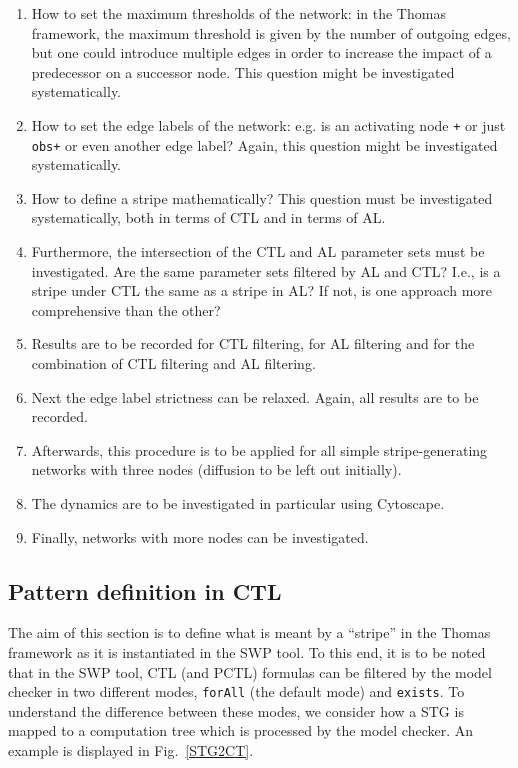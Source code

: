 \documentclass{article}
\begin{document}
\begin{flushleft}
\begin{enumerate}
  \item How to set the maximum thresholds of the network: in the Thomas
  framework, the maximum threshold is given by the number of outgoing edges, but
  one could introduce multiple edges in order to increase the impact of a
  predecessor on a successor node. This question might be investigated
  systematically.
  \item How to set the edge labels of the network: e.g. is an activating node
  {\tt +} or just {\tt obs+} or even another edge label? Again, this question
  might be investigated systematically.
  \item How to define a stripe mathematically? This question must be
  investigated systematically, both in terms of CTL and in terms of AL.
  \item Furthermore, the intersection of the CTL and AL parameter sets must be
  investigated. Are the same parameter sets filtered by AL and CTL? I.e., is a
  stripe under CTL the same as a stripe in AL? If not, is one approach more
  comprehensive than the other?
  \item Results are to be recorded for CTL filtering, for AL filtering and for
  the combination of CTL filtering and AL filtering.
  \item Next the edge label strictness can be relaxed. Again, all results are to
  be recorded.
  \item Afterwards, this procedure is to be applied for all simple
  stripe-generating networks with three nodes (diffusion to be left out initially).
  \item The dynamics are to be investigated in particular using
  Cytoscape.
  \item Finally, networks with more nodes can be investigated.
\end{enumerate}

\subsection{Pattern definition in CTL}

The aim of this section is to define what is meant by a ``stripe'' in the
Thomas framework as it is instantiated in the SWP tool. %
To this end, it is to be noted that in the SWP tool, CTL (and PCTL) formulas can
be filtered by the model checker in two different modes, {\tt forAll} (the default mode) and
{\tt exists}. To understand the difference between these modes, we consider how
a STG is mapped to a computation tree which is processed by the model
checker. An example is displayed in Fig.~\ref{STG2CT}.


\end{flushleft}
\end{document}
